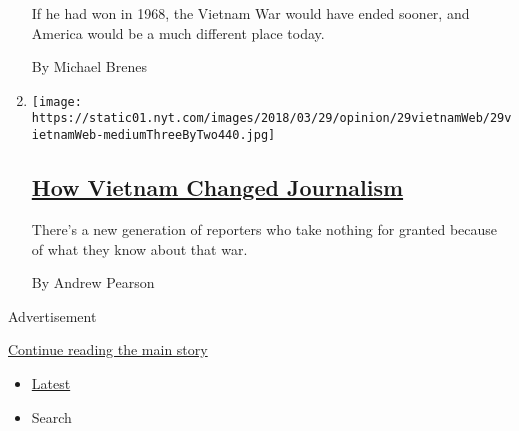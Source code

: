 \begin{enumerate}
  If he had won in 1968, the Vietnam War would have ended sooner, and
  America would be a much different place today.

  By Michael Brenes
\item
  \texttt{[image: https://static01.nyt.com/images/2018/03/29/opinion/29vietnamWeb/29vietnamWeb-mediumThreeByTwo440.jpg]}

  \hypertarget{how-vietnam-changed-journalism}{%
  \subsection{\texorpdfstring{\href{/2018/03/29/opinion/vietnam-war-journalism.html}{How
  Vietnam Changed
  Journalism}}{How Vietnam Changed Journalism}}\label{how-vietnam-changed-journalism}}

  There's a new generation of reporters who take nothing for granted
  because of what they know about that war.

  By Andrew Pearson
\end{enumerate}

Advertisement

\protect\hyperlink{after-mid1}{Continue reading the main story}

\begin{itemize}
\tightlist
\item
  \protect\hyperlink{stream-panel}{Latest}
\item
  Search
\end{itemize}

